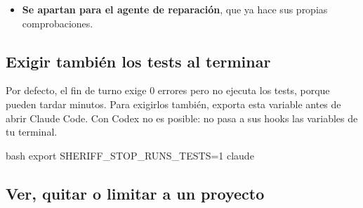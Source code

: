 \documentclass[11pt,a4paper]{article}
\begin{document}
\begin{itemize}
\begin{command}[basicstyle=\ttfamily\footnotesize]{respuesta}
  .sheriff.properties: SHERIFF_PROTOTYPE unset -> 1
  .sheriff.properties: coverage 100 -> 50

Next step: put each line back to its value before the arrow; committing it does not
keep it. If the user asked for one of these changes, make it with the sheriff_config
tool, which they approve; written any other way it is sent back again.
\end{command}
        Un cambio hecho con la página de ajustes, o pidiéndoselo al asistente
        (, que tú apruebas), es tuyo y no se devuelve.
        También lo es lo que cambies entre turnos, a mano o con
        , con commit o sin él: el turno siguiente parte de ahí.
        Durante un turno,  cuenta como una edición a
        mano, porque la shell del asistente también podría ejecutarlo. Si el
        asistente para sin devolver una línea a su valor, el hook le pide que
        te lo diga antes, y cada
        turno siguiente se devuelve por esa línea hasta que se deshaga o se
        haga con .
  \item \textbf{Se apartan para el agente de reparación}, que ya hace sus propias
        comprobaciones.
\end{itemize}

\subsection{Exigir también los tests al terminar}

Por defecto, el fin de turno exige 0 errores pero no ejecuta los tests, porque
pueden tardar minutos. Para exigirlos también, exporta esta variable antes de
abrir Claude Code. Con Codex no es posible: no pasa a sus hooks las variables de
tu terminal.

\begin{command}{bash}
export SHERIFF_STOP_RUNS_TESTS=1
claude
\end{command}

\subsection{Ver, quitar o limitar a un proyecto}
\end{document}
